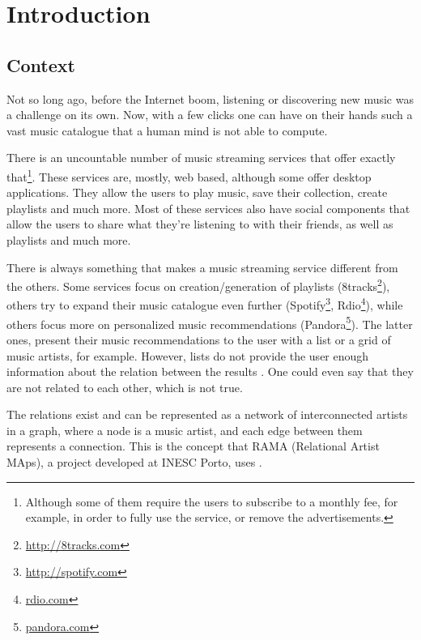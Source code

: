 
\chapter{Introduction} \label{chap:intro}


\section*{}

\section{Context} \label{sec:context}


  Not so long ago, before the Internet boom, listening or discovering new music was a challenge on its own.
  Now, with a few clicks one can have on their hands such a vast music catalogue that a human mind is not able to compute.

  There is an uncountable number of music streaming services that offer exactly that\footnote{Although some of them require the users to subscribe to a monthly fee, for example, in order to fully use the service, or remove the advertisements.}.
  These services are, mostly, web based, although some offer desktop applications.
  They allow the users to play music, save their collection, create playlists and much more.
  Most of these services also have social components that allow the users to share what they're listening to with their friends, as well as playlists and much more.

  There is always something that makes a music streaming service different from the others.
  Some services focus on creation/generation of playlists (8tracks\footnote{\url{http://8tracks.com}}), others try to expand their music catalogue even further (Spotify\footnote{\url{http://spotify.com}}, Rdio\footnote{\url{rdio.com}}), while others focus more on personalized music recommendations (Pandora\footnote{\url{pandora.com}}).
  The latter ones, present their music recommendations to the user with a list or a grid of music artists, for example.
  However, lists do not provide the user enough information about the relation between the results \cite{Lamere2008}.
  One could even say that they are not related to each other, which is not true.
  
  The relations exist and can be represented as a network of interconnected artists in a graph, where a node is a music artist, and each edge between them represents a connection.
  This is the concept that RAMA (Relational Artist MAps), a project developed at INESC Porto, uses \cite{Costa2008} \cite{Sarmento2009} \cite{Costa2009} \cite{Gouyon2011}.

